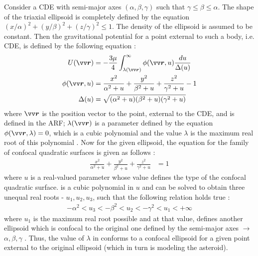Consider a \gls{CDE} with semi-major axes $(\alpha, \beta, \gamma)$ such that $\gamma \leq \beta \leq \alpha$. The shape of the triaxial ellipsoid is completely defined by the equation $(x/\alpha)^2 + (y/\beta)^2 + (z/\gamma)^2 \leq 1$. The density of the ellipsoid is assumed to be constant. Then the gravitational potential for a point external to such a body, i.e. \gls{CDE}, is defined by the following equation \parencite{scheeresBook}:
\begin{align}
    U(\bvector{r}) &= -\frac{3\mu}{4} \int_{\lambda(\bvector{r})}^{\infty} \phi(\bvector{r}, u) \frac{du}{\Delta(u)}
    \label{eqn:ellipsoid_potential_short_form} \\
    \phi(\bvector{r}, u) &= \frac{x^2}{\alpha^2 + u} + \frac{y^2}{\beta^2 + u} + \frac{z^2}{\gamma^2 + u} - 1
    \label{eqn:ellipsoid_potential_phi} \\
    \Delta(u) &= \sqrt{(\alpha^2 + u)(\beta^2 + u)(\gamma^2 + u)}
    \label{eqn:ellipsoid_potential_delta}
\end{align}
where $\bvector{r}$ is the position vector to the point, external to the \gls{CDE}, and is defined in the \gls{ARF}; $\lambda(\bvector{r})$ is a parameter defined by the equation $\phi(\bvector{r}, \lambda) = 0$, which is a cubic polynomial and the value $\lambda$ is the maximum real root of this polynomial \parencite{scheeresBook}. Now for the given ellipsoid, the equation for the family of confocal quadratic surfaces is given as follows \parencite{ellipsoid_potential_model}:
\begin{align}
    \frac{x^2}{\alpha^2 + u} + \frac{y^2}{\beta^2 + u} + \frac{z^2}{\gamma^2 + u} &= 1
    \label{eqn:confocal_quadrics}
\end{align}
where $u$ is a real-valued parameter whose value defines the type of the confocal quadratic surface.  is a cubic polynomial in $u$ and can be solved to obtain three unequal real roots - $u_1, u_2, u_3$, such that the following relation holds true \parencite{ellipsoid_potential_model}:
\begin{align}
    -\alpha^2 < u_3 < -\beta^2 < u_2 < -\gamma^2 < u_1 < +\infty
    \label{eqn:confocal_quadrics_all_real_roots}
\end{align}
where $u_1$ is the maximum real root possible and at that value,  defines another ellipsoid which is confocal to the original one defined by the semi-major axes $\rightarrow$ $\alpha, \beta, \gamma$ \parencite{ellipsoid_potential_model}. Thus, the value of $\lambda$ in  conforms to a confocal ellipsoid for a given point external to the original ellipsoid (which in turn is modeling the asteroid).
